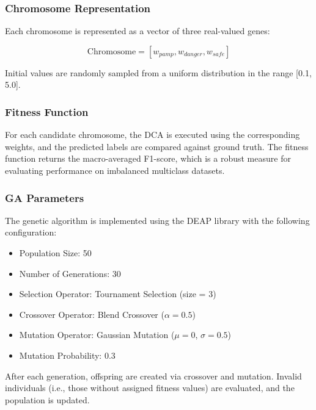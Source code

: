 \documentclass[conference]{IEEEtran}
\begin{document}
\subsubsection{Chromosome Representation}

Each chromosome is represented as a vector of three real-valued genes:

\[
  \text{Chromosome} = [w_{pamp}, w_{danger}, w_{safe}]
\]

Initial values are randomly sampled from a uniform distribution in
the range [0.1, 5.0].

\subsubsection{Fitness Function}

For each candidate chromosome, the DCA is executed using the
corresponding weights, and the predicted labels are compared against
ground truth. The fitness function returns the macro-averaged
F1-score, which is a robust measure for evaluating performance on
imbalanced multiclass datasets.

\subsubsection{GA Parameters}

The genetic algorithm is implemented using the DEAP library with the
following configuration:

\begin{itemize}
  \item Population Size: 50
  \item Number of Generations: 30
  \item Selection Operator: Tournament Selection (size = 3)
  \item Crossover Operator: Blend Crossover ($\alpha=0.5$)
  \item Mutation Operator: Gaussian Mutation ($\mu=0$, $\sigma=0.5$)
  \item Mutation Probability: 0.3
\end{itemize}

After each generation, offspring are created via crossover and
mutation. Invalid individuals (i.e., those without assigned fitness
values) are evaluated, and the population is updated.
\end{document}
